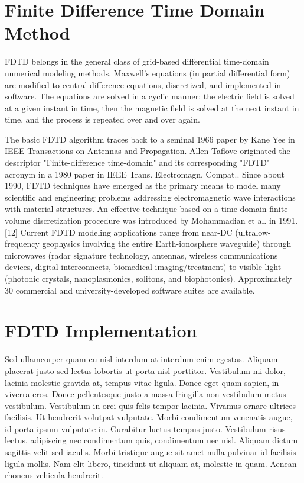 
\section{Finite Difference Time Domain Method}

FDTD belongs in the general class of grid-based differential time-domain numerical modeling methods. Maxwell's equations (in partial differential form) are modified to central-difference equations, discretized, and implemented in software. The equations are solved in a cyclic manner: the electric field is solved at a given instant in time, then the magnetic field is solved at the next instant in time, and the process is repeated over and over again.

The basic FDTD algorithm traces back to a seminal 1966 paper by Kane Yee in IEEE Transactions on Antennas and Propagation. Allen Taflove originated the descriptor "Finite-difference time-domain" and its corresponding "FDTD" acronym in a 1980 paper in IEEE Trans. Electromagn. Compat.. Since about 1990, FDTD techniques have emerged as the primary means to model many scientific and engineering problems addressing electromagnetic wave interactions with material structures. An effective technique based on a time-domain finite-volume discretization procedure was introduced by Mohammadian et al. in 1991.[12] Current FDTD modeling applications range from near-DC (ultralow-frequency geophysics involving the entire Earth-ionosphere waveguide) through microwaves (radar signature technology, antennas, wireless communications devices, digital interconnects, biomedical imaging/treatment) to visible light (photonic crystals, nanoplasmonics, solitons, and biophotonics). Approximately 30 commercial and university-developed software suites are available.

\section{FDTD Implementation}

Sed ullamcorper quam eu nisl interdum at interdum enim egestas. Aliquam placerat justo sed lectus lobortis ut porta nisl porttitor. Vestibulum mi dolor, lacinia molestie gravida at, tempus vitae ligula. Donec eget quam sapien, in viverra eros. Donec pellentesque justo a massa fringilla non vestibulum metus vestibulum. Vestibulum in orci quis felis tempor lacinia. Vivamus ornare ultrices facilisis. Ut hendrerit volutpat vulputate. Morbi condimentum venenatis augue, id porta ipsum vulputate in. Curabitur luctus tempus justo. Vestibulum risus lectus, adipiscing nec condimentum quis, condimentum nec nisl. Aliquam dictum sagittis velit sed iaculis. Morbi tristique augue sit amet nulla pulvinar id facilisis ligula mollis. Nam elit libero, tincidunt ut aliquam at, molestie in quam. Aenean rhoncus vehicula hendrerit.

